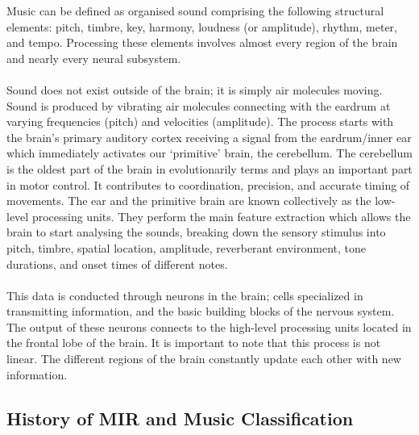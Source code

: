 Music can be defined as organised sound comprising the following structural elements: pitch, timbre, key, harmony, loudness (or amplitude), rhythm, meter, and tempo. Processing
these elements involves almost every region of the brain and nearly every neural subsystem.\\
\\
Sound does not exist outside of the brain; it is simply air molecules moving. Sound is produced by vibrating air molecules connecting with the
eardrum at varying frequencies (pitch) and velocities (amplitude). The process starts with the brain’s primary auditory cortex receiving a signal from the eardrum/inner ear
which immediately activates our ‘primitive’ brain, the cerebellum. The cerebellum is the oldest part of the brain in evolutionarily terms and plays an important part in motor control.
It contributes to coordination, precision, and accurate timing of movements. The ear and the primitive brain are known collectively as the low-level processing units. They perform the
main feature extraction which allows the brain to start analysing the sounds, breaking down the sensory stimulus into pitch, timbre, spatial location, amplitude, reverberant environment,
tone durations, and onset times of different notes. \\
\\
This data is conducted through neurons in the brain; cells specialized in transmitting information, and the basic building blocks of the nervous system.
The output of these neurons connects to the high-level processing units located in the frontal lobe of the brain. It is important to note that this process
is not linear. The different regions of the brain constantly update each other with new information. \\

\subsection{History of MIR and Music Classification}

